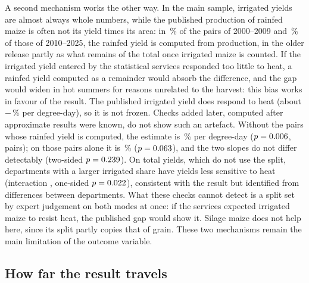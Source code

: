 A second mechanism works the other way. In the main sample, irrigated yields are almost always whole numbers, while the published production of rainfed maize is often not its yield times its area: in \SplitDerivOld\,\% of the pairs of 2000--2009 and \SplitDerivNew\,\% of those of 2010--2025, the rainfed yield is computed from production, in the older release partly as what remains of the total once irrigated maize is counted. If the irrigated yield entered by the statistical services responded too little to heat, a rainfed yield computed as a remainder would absorb the difference, and the gap would widen in hot summers for reasons unrelated to the harvest: this bias works in favour of the result. The published irrigated yield does respond to heat (about $-$\QoneIrrigatedPct\,\% per degree-day), so it is not frozen. Checks added later, computed after approximate results were known, do not show such an artefact. Without the pairs whose rainfed yield is computed, the estimate is \SplitNoDerivPct\,\% per degree-day ($p = 0.006$, \SplitNoDerivN{} pairs); on those pairs alone it is \SplitDerivPct\,\% ($p = 0.063$), and the two slopes do not differ detectably (two-sided $p = 0.239$). On total yields, which do not use the split, departments with a larger irrigated share have yields less sensitive to heat (interaction \TotalInter, one-sided $p = 0.022$), consistent with the result but identified from differences between departments. What these checks cannot detect is a split set by expert judgement on both modes at once: if the services expected irrigated maize to resist heat, the published gap would show it. Silage maize does not help here, since its split partly copies that of grain. These two mechanisms remain the main limitation of the outcome variable.

\subsection{How far the result travels}

